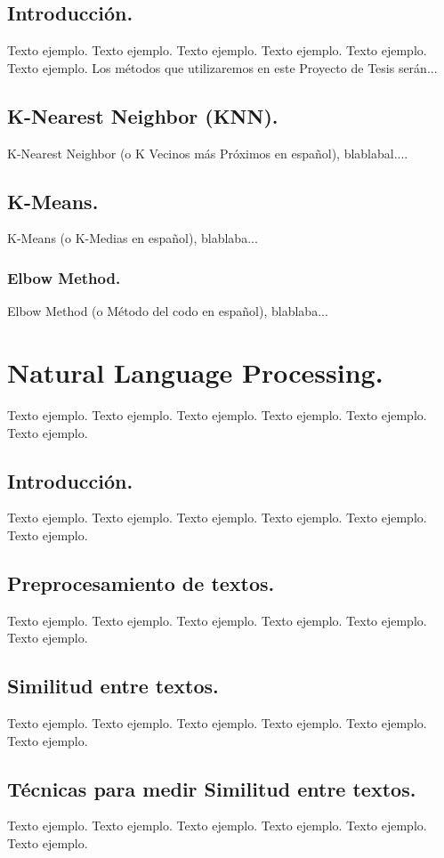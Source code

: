 \documentclass[12pt,a4paper]{article}
\begin{document}
\subsection{Introducción.}
Texto ejemplo. Texto ejemplo. Texto ejemplo. Texto ejemplo. Texto ejemplo. Texto ejemplo.
Los métodos que utilizaremos en este Proyecto de Tesis serán...

\subsection{K-Nearest Neighbor (KNN).}
K-Nearest Neighbor (o K Vecinos más Próximos en español), blablabal....

\subsection{K-Means.}
K-Means (o K-Medias en español), blablaba...

\subsubsection{Elbow Method.}
Elbow Method (o Método del codo en español), blablaba...

\section{Natural Language Processing.}
Texto ejemplo. Texto ejemplo. Texto ejemplo. Texto ejemplo. Texto ejemplo. Texto ejemplo.

\subsection{Introducción.}
Texto ejemplo. Texto ejemplo. Texto ejemplo. Texto ejemplo. Texto ejemplo. Texto ejemplo.

\subsection{Preprocesamiento de textos.}
Texto ejemplo. Texto ejemplo. Texto ejemplo. Texto ejemplo. Texto ejemplo. Texto ejemplo.

\subsection{Similitud entre textos.}
Texto ejemplo. Texto ejemplo. Texto ejemplo. Texto ejemplo. Texto ejemplo. Texto ejemplo.

\subsection{Técnicas para medir Similitud entre textos.}
Texto ejemplo. Texto ejemplo. Texto ejemplo. Texto ejemplo. Texto ejemplo. Texto ejemplo.
\end{document}
